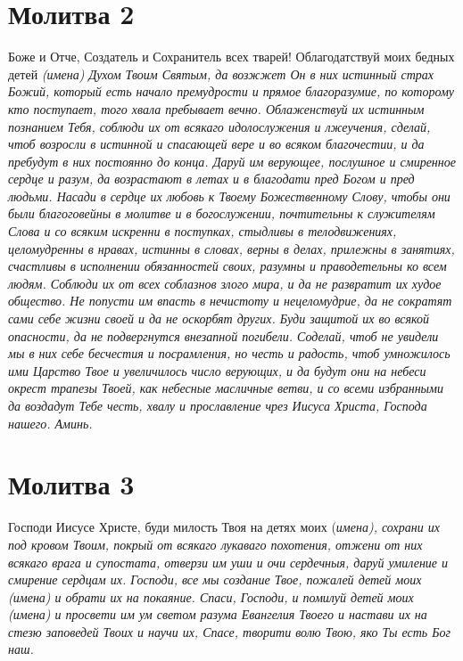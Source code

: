 \section{Молитва 2}\begin{mymulticols}



Боже и Отче, Создатель и Сохранитель всех тварей! Облагодатствуй моих бедных детей \itshape (имена)\normalfont{} Духом Твоим Святым, да возжжет Он в них истинный страх Божий, который есть начало премудрости и прямое благоразумие, по которому кто поступает, того хвала пребывает вечно. Облаженствуй их истинным познанием Тебя, соблюди их от всякаго идолослужения и лжеучения, сделай, чтоб возросли в истинной и спасающей вере и во всяком благочестии, и да пребудут в них постоянно до конца. Даруй им верующее, послушное и смиренное сердце и разум, да возрастают в летах и в благодати пред Богом и пред людьми. Насади в сердце их любовь к Твоему Божественному Слову, чтобы они были благоговейны в молитве и в богослужении, почтительны к служителям Слова и со всяким искренни в поступках, стыдливы в телодвижениях, целомудренны в нравах, истинны в словах, верны в делах, прилежны в занятиях, счастливы в исполнении обязанностей своих, разумны и праводетельны ко всем людям. Соблюди их от всех соблазнов злого мира, и да не развратит их худое общество. Не попусти им впасть в нечистоту и нецеломудрие, да не сократят сами себе жизни своей и да не оскорбят других. Буди защитой их во всякой опасности, да не подвергнутся внезапной погибели. Соделай, чтоб не увидели мы в них себе бесчестия и посрамления, но честь и радость, чтоб умножилось ими Царство Твое и увеличилось число верующих, и да будут они на небеси окрест трапезы Твоей, как небесные масличные ветви, и со всеми избранными да воздадут Тебе честь, хвалу и прославление чрез Иисуса Христа, Господа нашего. Аминь.


\end{mymulticols}

\section{Молитва 3}\begin{mymulticols}



Господи Иисусе Христе, буди милость Твоя на детях моих (\itshape имена\normalfont{}), сохрани их под кровом Твоим, покрый от всякаго лукаваго похотения, отжени от них всякаго врага и супостата, отверзи им уши и очи сердечныя, даруй умиление и смирение сердцам их. Господи, все мы создание Твое, пожалей детей моих (\itshape имена\normalfont{}) и обрати их на покаяние. Спаси, Господи, и помилуй детей моих (\itshape имена\normalfont{}) и просвети им ум светом разума Евангелия Твоего и настави их на стезю заповедей Твоих и научи их, Спасе, творити волю Твою, яко Ты есть Бог наш.


\end{mymulticols}

